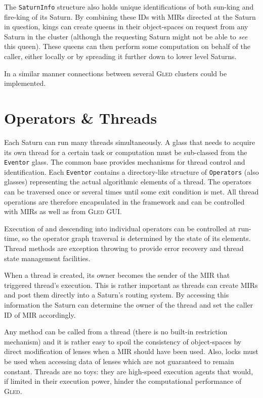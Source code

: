 \documentclass[a4paper,11pt]{article}
\def\gled{\textsc{Gled}\xspace}
\def\smalltt#1{{\small\texttt{#1}}}
\begin{document}
The \smalltt{SaturnInfo} structure also holds unique identifications of
both sun-king and fire-king of its Saturn. By combining these IDs with
MIRs directed at the Saturn in question, kings can create queens in
their object-spaces on request from any Saturn in the cluster
(although the requesting Saturn might not be able to \emph{see} this
queen). These queens can then perform some computation on behalf of the
caller, either locally or by spreading it further down to lower level
Saturns.

In a similar manner connections between several \gled clusters could be
implemented.


\section{Operators \& Threads}
\label{sec:threads}

Each Saturn can run many threads simultaneously. A glass that needs to
acquire its own thread for a certain task or computation must be
sub-classed from the \smalltt{Eventor} glass. The common base provides
mechanisms for thread control and identification. Each
\smalltt{Eventor} contains a directory-like structure of
\smalltt{Operators} (also glasses) representing the actual algorithmic
elements of a thread. The operators can be traversed once or
several times until some exit condition is met. All thread operations
are therefore encapsulated in the framework and can be controlled with
MIRs as well as from \gled GUI.

Execution of and descending into individual operators can be
controlled at run-time, so the operator graph traversal is determined
by the state of its elements. Thread methods are exception throwing to
provide error recovery and thread state management facilities.

When a thread is created, its owner becomes the sender of the MIR that
triggered thread's execution. This is rather important as threads can
create MIRs and post them directly into a Saturn's routing system.
By accessing this information the Saturn can determine the owner of
the thread and set the caller ID of MIR accordingly.

Any method can be called from a thread (there is no built-in
restriction mechanism) and it is rather easy to spoil the consistency
of object-spaces by direct modification of lenses when a MIR should have
been used. Also, locks must be used when accessing data of lenses
which are not guaranteed to remain constant. Threads are no toys: they
are high-speed execution agents that would, if limited in their
execution power, hinder the computational performance of \gled.
\end{document}
